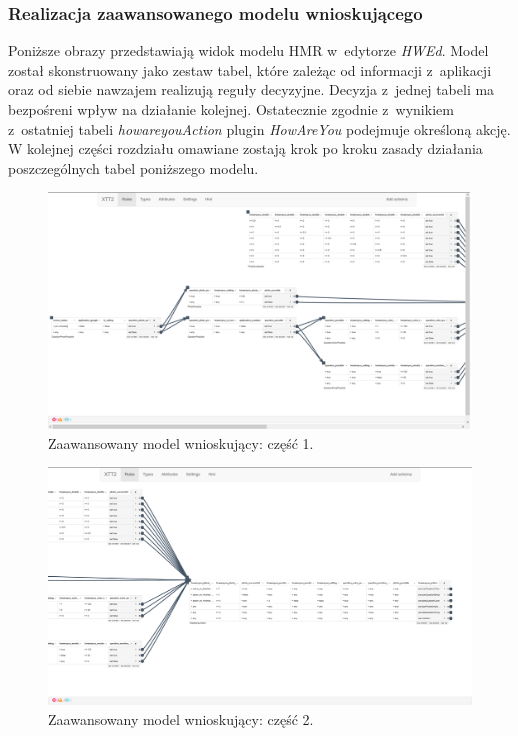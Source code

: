 \subsubsection{Realizacja zaawansowanego modelu wnioskującego}

Poniższe obrazy przedstawiają widok modelu HMR w~edytorze \textit{HWEd}. Model został skonstruowany jako zestaw tabel, które zależąc od informacji z~aplikacji oraz od siebie nawzajem realizują reguły decyzyjne. Decyzja z~jednej tabeli ma bezpośreni wpływ na działanie kolejnej. Ostatecznie zgodnie z~wynikiem z~ostatniej tabeli \textit{howareyouAction} plugin \textit{HowAreYou} podejmuje określoną akcję. W kolejnej części rozdziału omawiane zostają krok po kroku zasady działania poszczególnych tabel poniższego modelu.

\begin{figure}[H]
	\centering
	\includegraphics[scale=0.75]{rozdzial4/HMR_advancedModelPart1.png}
	\caption{Zaawansowany model wnioskujący: część 1.}
\end{figure}

\begin{figure}[H]
	\centering
	\includegraphics[scale=0.75]{rozdzial4/HMR_advancedModelPart2.png}
	\caption{Zaawansowany model wnioskujący: część 2.}
\end{figure}


